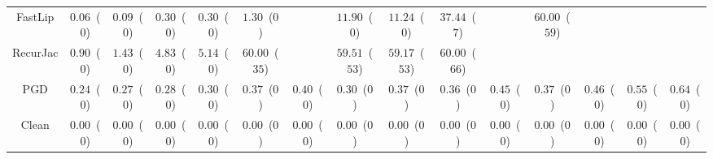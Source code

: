 \begin{table*}
{\begin{tabular}{c|c|c|c|c|c|c|c|c|c|c|c|c|c|c}
      FastLip &  $0.06$~($0$) &  $0.09$~($0$) &  $0.30$~($0$) &  $0.30$~($0$) &  $1.30$~($0$) &               & $11.90$~($0$) & $11.24$~($0$) & $37.44$~($7$) &               & $60.00$~($59$) &               &               &               \\
     RecurJac &  $0.90$~($0$) &  $1.43$~($0$) &  $4.83$~($0$) &  $5.14$~($0$) & $60.00$~($35$) &               & $59.51$~($53$) & $59.17$~($53$) & $60.00$~($66$) &               &               &               &               &               \\
\hline
          PGD &  $0.24$~($0$) &  $0.27$~($0$) &  $0.28$~($0$) &  $0.30$~($0$) &  $0.37$~($0$) &  $0.40$~($0$) &  $0.30$~($0$) &  $0.37$~($0$) &  $0.36$~($0$) &  $0.45$~($0$) &  $0.37$~($0$) &  $0.46$~($0$) &  $0.55$~($0$) &  $0.64$~($0$) \\
\hline
        Clean &  $0.00$~($0$) &  $0.00$~($0$) &  $0.00$~($0$) &  $0.00$~($0$) &  $0.00$~($0$) &  $0.00$~($0$) &  $0.00$~($0$) &  $0.00$~($0$) &  $0.00$~($0$) &  $0.00$~($0$) &  $0.00$~($0$) &  $0.00$~($0$) &  $0.00$~($0$) &  $0.00$~($0$) \\

    \bottomrule
    \end{tabular}
    }
    \label{table:exp-A-robust-accuracy-time-cifar10-2}
\end{table*}
        

